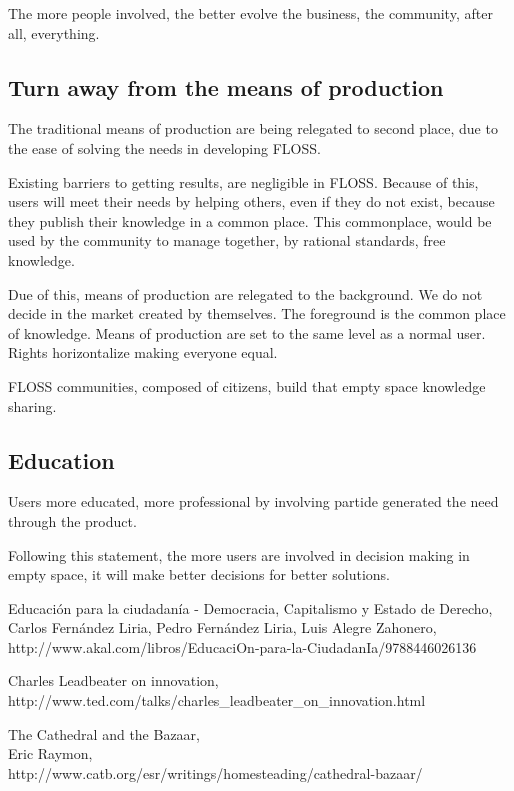 \documentclass[11pt]{scrartcl}
\begin{document}
\par The more people involved, the better evolve the business, the community, after all, everything.

\subsection{Turn away from the means of production}
\label{sub:turn-production}

\par The traditional means of production are being relegated to second place, due to the ease of solving the needs in developing FLOSS.

\par Existing barriers to getting results, are negligible in FLOSS.
Because of this, users will meet their needs by helping others, even if they do not exist, because they publish their knowledge in a common place. This commonplace, would be used by the community to manage together, by rational standards, free knowledge.

\par Due of this, means of production are relegated to the background. We do not decide in the market created by themselves. The foreground is the common place of knowledge. Means of production are set to the same level as a normal user. Rights horizontalize making everyone equal.

\par FLOSS communities, composed of citizens, build that empty space knowledge sharing\cite{edu-ciudadania}.

\subsection{Education}
\label{sub:education}

\par Users more educated, more professional by involving partide generated the need through the product.

\par Following this statement, the more users are involved in decision making in empty space, it will make better decisions for better solutions.

\begin{thebibliography}{9}

    Educación para la ciudadanía - Democracia, Capitalismo y Estado de Derecho,\\
    Carlos Fernández Liria, Pedro Fernández Liria, Luis Alegre Zahonero,\\
    http://www.akal.com/libros/EducaciOn-para-la-CiudadanIa/9788446026136

    Charles Leadbeater on innovation,\\
    http://www.ted.com/talks/charles\_leadbeater\_on\_innovation.html

    The Cathedral and the Bazaar,\\
    Eric Raymon,\\
    http://www.catb.org/esr/writings/homesteading/cathedral-bazaar/
    
\end{thebibliography}
\end{document}
